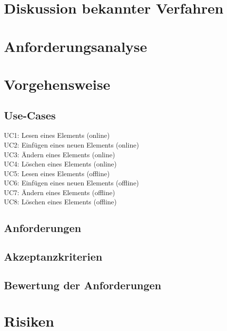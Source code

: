 \documentclass[oneside,11pt,parskip=half,ngerman]{scrreprt}
\begin{document}
\section{Diskussion bekannter
Verfahren}\label{diskussion-bekannter-verfahren}

\section{Anforderungsanalyse}\label{anforderungsanalyse}

\section{Vorgehensweise}\label{vorgehensweise}

\subsection{Use-Cases}\label{use-cases}

UC1: Lesen eines Elements (online)\\UC2: Einfügen eines neuen Elements
(online)\\UC3: Ändern eines Elements (online)\\UC4: Löschen eines
Elements (online)\\UC5: Lesen eines Elements (offline)\\UC6: Einfügen
eines neuen Elements (offline)\\UC7: Ändern eines Elements
(offline)\\UC8: Löschen eines Elements (offline)

\subsection{Anforderungen}\label{anforderungen}

\subsection{Akzeptanzkriterien}\label{akzeptanzkriterien}

\subsection{Bewertung der
Anforderungen}\label{bewertung-der-anforderungen}

\section{Risiken}\label{risiken}
\end{document}
